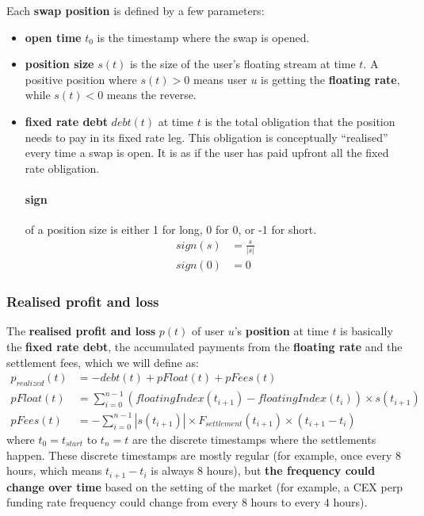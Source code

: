 \documentclass{article}%
\begin{document}
Each \textbf{swap position} is defined by a few parameters:
\begin{itemize}
    \item \textbf{open time} $t_0$ is the timestamp where the swap is opened.
    \item \textbf{position size} $s(t)$ is the size of the user's floating stream at time $t$. A positive position where $s(t)>0$ means user $u$ is getting the \textbf{floating rate}, while $s(t)<0$ means the reverse. 
    \item \textbf{fixed rate debt} $debt(t)$ at time $t$ is the total obligation that the position needs to pay in its fixed rate leg. This obligation is conceptually ``realised'' every time a swap is open. It is as if the user has paid upfront all the fixed rate obligation.

\paragraph{sign} of a position size is either 1 for long, 0 for 0, or -1 for short.
\begin{align*}
    sign(s) &= \frac{s}{|s|}\\
    sign(0) &= 0
\end{align*}
\end{itemize}

\subsubsection{Realised profit and loss} \label{realisedPnL}

The \textbf{realised profit and loss} $p(t)$ of user $u$'s \textbf{position} at time $t$ is basically the \textbf{fixed rate debt}, the accumulated payments from the \textbf{floating rate} and the settlement fees, which we will define as:
    \begin{align}
        p_{realized}(t) &= -debt(t) +pFloat(t) + pFees(t) \\
        pFloat(t) &= \sum_{i=0}^{n-1}\left( floatingIndex(t_{i+1}) - floatingIndex(t_i) \right) \times s(t_{i+1}) \\
        pFees(t) &= -\sum_{i=0}^{n-1} | s(t_{i+1}) | \times F_{settlement}(t_{i+1}) \times (t_{i+1} - t_{i})
    \end{align}
    where $t_0 = t_{start}$ to $t_{n}=t$ are the discrete timestamps where the settlements happen. These discrete timestamps are mostly regular (for example, once every 8 hours, which means $t_{i+1} - t_{i}$ is always 8 hours), but \textbf{the frequency could change over time} based on the setting of the market (for example, a CEX perp funding rate frequency could change from every 8 hours to every 4 hours).
\end{document}
